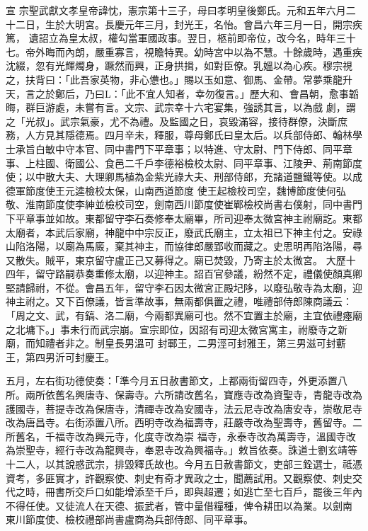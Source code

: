 
\begin{pinyinscope}

 宣
 宗聖武獻文孝皇帝諱忱，憲宗第十三子，母曰孝明皇後鄭氏。元和五年六月二十二日，生於大明宮。長慶元年三月，封光王，名怡。會昌六年三月一日，開宗疾篤，
 遺詔立為皇太叔，權勾當軍國政事。翌日，柩前即帝位，改今名，時年三十七。帝外晦而內朗，嚴重寡言，視瞻特異。幼時宮中以為不慧。十餘歲時，遇重疾沈綴，忽有光輝燭身，蹶然而興，正身拱揖，如對臣僚。乳媼以為心疾。穆宗視之，扶背曰：「此吾家英物，非心憊也。」賜以玉如意、御馬、金帶。常夢乘龍升天，言之於鄭后，乃曰L：「此不宜人知者，幸勿復言。」歷大和、會昌朝，愈事韜晦，群巨游處，未嘗有言。文宗、武宗幸十六宅宴集，強誘其言，以為戲
 劇，謂之「光叔」。武宗氣豪，尤不為禮。及監國之日，哀毀滿容，接待群僚，決斷庶務，人方見其隱德焉。四月辛未，釋服，尊母鄭氏曰皇太后。以兵部侍郎、翰林學士承旨白敏中守本官、同中書門下平章事；以特進、守太尉、門下侍郎、同平章事、上柱國、衛國公、食邑二千戶李德裕檢校太尉、同平章事、江陵尹、荊南節度使；以中散大夫、大理卿馬植為金紫光祿大夫、刑部侍郎，充諸道鹽鐵等使。以成德軍節度使王元逵檢校太保，山南西道節度
 使王起檢校司空，魏博節度使何弘敬、淮南節度使李紳並檢校司空，劍南西川節度使崔鄲檢校尚書右僕射，同中書門下平章事並如故。東都留守李石奏修奉太廟畢，所司迎奉太微宮神主祔廟訖。東都太廟者，本武后家廟，神龍中中宗反正，廢武氏廟主，立太祖已下神主付之。安祿山陷洛陽，以廟為馬廄，棄其神主，而協律郎嚴郢收而藏之。史思明再陷洛陽，尋又散失。賊平，東京留守盧正己又募得之。廟已焚毀，乃寄主於太微宮。
 大歷十四年，留守路嗣恭奏重修太廟，以迎神主。詔百官參議，紛然不定，禮儀使顏真卿堅請歸祔，不從。會昌五年，留守李石因太微宮正殿圮陊，以廢弘敬寺為太廟，迎神主祔之。又下百僚議，皆言準故事，無兩都俱置之禮，唯禮部侍郎陳商議云：「周之文、武，有鎬、洛二廟，今兩都異廟可也。然不宜置主於廟，主宜依禮瘞廟之北墉下。」事未行而武宗崩。宣宗即位，因詔有司迎太微宮寓主，祔廢寺之新廟，而知禮者非之。制皇長男溫可
 封鄆王，二男涇可封雅王，第三男滋可封蘄王，第四男沂可封慶王。



 五月，左右街功德使奏：「準今月五日赦書節文，上都兩街留四寺，外更添置八所。兩所依舊名興唐寺、保壽寺。六所請改舊名，寶應寺改為資聖寺，青龍寺改為護國寺，菩提寺改為保唐寺，清禪寺改為安國寺，法云尼寺改為唐安寺，崇敬尼寺改為唐昌寺。右街添置八所。西明寺改為福壽寺，莊嚴寺改為聖壽寺，舊留寺。二所舊名，千福寺改為興元寺，化度寺改為崇
 福寺，永泰寺改為萬壽寺，溫國寺改為崇聖寺，經行寺改為龍興寺，奉恩寺改為興福寺。」敕旨依奏。誅道士劉玄靖等十二人，以其說惑武宗，排毀釋氏故也。今月五日赦書節文，吏部三銓選士，祗憑資考，多匪實才，許觀察使、刺史有奇才異政之士，聞薦試用。又觀察使、刺史交代之時，冊書所交戶口如能增添至千戶，即與超遷；如逃亡至七百戶，罷後三年內不得任使。又徒流人在天德、振武者，管中量借糧種，俾令耕田以為業。以劍南
 東川節度使、檢校禮部尚書盧商為兵部侍郎、同平章事。




\end{pinyinscope}
